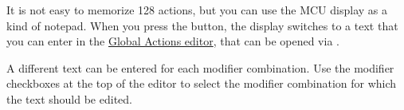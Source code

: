 It is not easy to memorize 128 actions, but you can use the MCU display as a
kind of notepad. When you press the \nv button, the display switches to a text
that you can enter in the \hyperref[F:Screenshot_Actions_Dialog]{Global Actions
editor}, that can be opened via \alt \nv. 


A different text can be entered for each modifier combination. Use the modifier
checkboxes at the top of the editor to select the modifier combination for
which the text should be edited.

